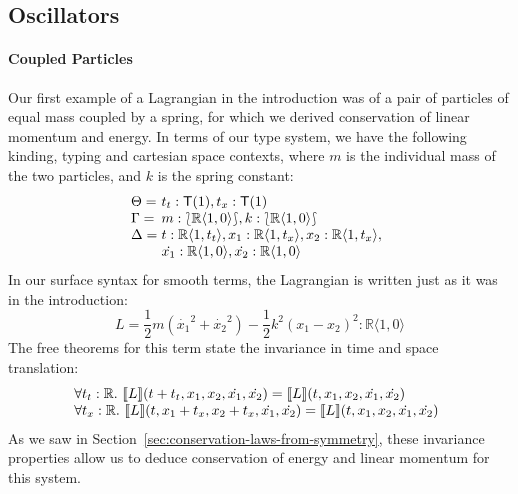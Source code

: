 \documentclass{sigplanconf}
\newcommand{\typeOfCartSp}[1]{\lbag #1 \rbag}
\theoremstyle{examplestyle}
\newcommand{\sem}[1]{\llbracket #1 \rrbracket}
\begin{document}
\subsection{Oscillators}

\paragraph{Coupled Particles} Our first example of a Lagrangian in the
introduction was of a pair of particles of equal mass coupled by a
spring, for which we derived conservation of linear momentum and
energy. In terms of our type system, we have the following kinding,
typing and cartesian space contexts, where $m$ is the individual mass
of the two particles, and $k$ is the spring constant:
\begin{displaymath}
  \begin{array}{l@{\hspace{0.3em}}l}
    \Theta = & t_t : \mathsf{T}(1), t_x : \mathsf{T}(1) \\
    \Gamma = & m : \typeOfCartSp{\mathbb{R}\langle 1, 0 \rangle}, k : \typeOfCartSp{\mathbb{R}\langle 1, 0 \rangle} \\
    \Delta = &
    \begin{array}[t]{@{}l}
      t : \mathbb{R}\langle 1, t_t \rangle, x_1 : \mathbb{R}\langle 1, t_x \rangle, x_2 : \mathbb{R}\langle 1, t_x \rangle, \\
      \dot{x_1} : \mathbb{R}\langle 1, 0 \rangle, \dot{x_2} : \mathbb{R}\langle 1, 0 \rangle
\end{array}
  \end{array}
\end{displaymath}
In our surface syntax for smooth terms, the Lagrangian is written just
as it was in the introduction:
\begin{displaymath}
  L = \frac{1}{2}m(\dot{x_1}^2 + \dot{x_2}^2) - \frac{1}{2}k^2(x_1 - x_2)^2 : \mathbb{R}\langle 1, 0 \rangle
\end{displaymath}
The free theorems for this term state the invariance in time and space
translation:
\begin{displaymath}
  \begin{array}{@{}l}
    \forall t_t : \mathbb{R}.~\sem{L}(t + t_t, x_1, x_2, \dot{x_1}, \dot{x_2}) = \sem{L}(t, x_1, x_2, \dot{x_1}, \dot{x_2}) \\
    \forall t_x : \mathbb{R}.~\sem{L}(t, x_1 + t_x, x_2 + t_x, \dot{x_1}, \dot{x_2}) = \sem{L}(t, x_1, x_2, \dot{x_1}, \dot{x_2})
  \end{array}
\end{displaymath}
As we saw in Section~\ref{sec:conservation-laws-from-symmetry}, these
invariance properties allow us to deduce conservation of energy and
linear momentum for this system.
\end{document}

